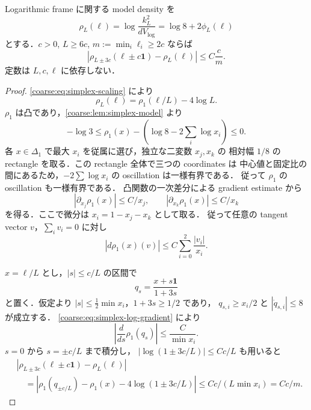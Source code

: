\begin{lemma}
\label{coarse:lem:simplex-shift}
Logarithmic frame に関する model density を
\begin{equation}\label{coarse:eq:simplex-log-density}
 \rho_L(\ell)=\log\frac{k_L^2}{dV_{\log}}
             =\log8+2\phi_L(\ell)
\end{equation}
とする．$c>0$, $L\ge6c$, $m:=\min_i\ell_i\ge2c$ ならば
\begin{equation}\label{coarse:eq:simplex-shift-bound}
 \left|\rho_{L\pm3c}(\ell\pm c\mathbf1)-\rho_L(\ell)\right|
 \le C\frac{c}{m}.
\end{equation}
定数は $L,c,\ell$ に依存しない．
\end{lemma}

\begin{proof}
\eqref{coarse:eq:simplex-scaling} により
\[
 \rho_L(\ell)=\rho_1(\ell/L)-4\log L.
\]
$\rho_1$ は凸であり，\cref{coarse:lem:simplex-model} より
\[
 -\log3\le
 \rho_1(x)-\left(\log8-2\sum_i\log x_i\right)\le0.
\]
各 $x\in\Delta_1$ で最大 $x_i$ を従属に選び，独立な二変数 $x_j,x_k$ の
相対幅 $1/8$ の rectangle を取る．この rectangle 全体で三つの coordinates は
中心値と固定比の間にあるため，$-2\sum\log x_i$ の oscillation は一様有界である．
従って $\rho_1$ の oscillation も一様有界である．
凸関数の一次差分による gradient estimate から
\[
 |\partial_{x_j}\rho_1(x)|\le C/x_j,
 \qquad |\partial_{x_k}\rho_1(x)|\le C/x_k
\]
を得る．ここで微分は $x_i=1-x_j-x_k$ として取る．
従って任意の tangent vector $v$，$\sum_i v_i=0$ に対し
\begin{equation}\label{coarse:eq:simplex-log-gradient}
 |d\rho_1(x)(v)|\le C\sum_{i=0}^2\frac{|v_i|}{x_i}.
\end{equation}

$x=\ell/L$ とし，$|s|\le c/L$ の区間で
\[
 q_s=\frac{x+s\mathbf1}{1+3s}
\]
と置く．仮定より $|s|\le\frac12\min x_i$，$1+3s\ge1/2$ であり，
$q_{s,i}\ge x_i/2$ と $|\dot q_{s,i}|\le8$ が成立する．
\eqref{coarse:eq:simplex-log-gradient} により
\[
 \left|\frac{d}{ds}\rho_1(q_s)\right|
 \le\frac{C}{\min x_i}.
\]
$s=0$ から $s=\pm c/L$ まで積分し，
$|\log(1\pm3c/L)|\le Cc/L$ も用いると
\[
 \begin{split}
 &\left|\rho_{L\pm3c}(\ell\pm c\mathbf1)-\rho_L(\ell)\right|\\
 &\quad=
 \left|\rho_1(q_{\pm c/L})-\rho_1(x)
             -4\log(1\pm3c/L)\right|
 \le Cc/(L\min x_i)=Cc/m.
 \end{split}
\]
\end{proof}

